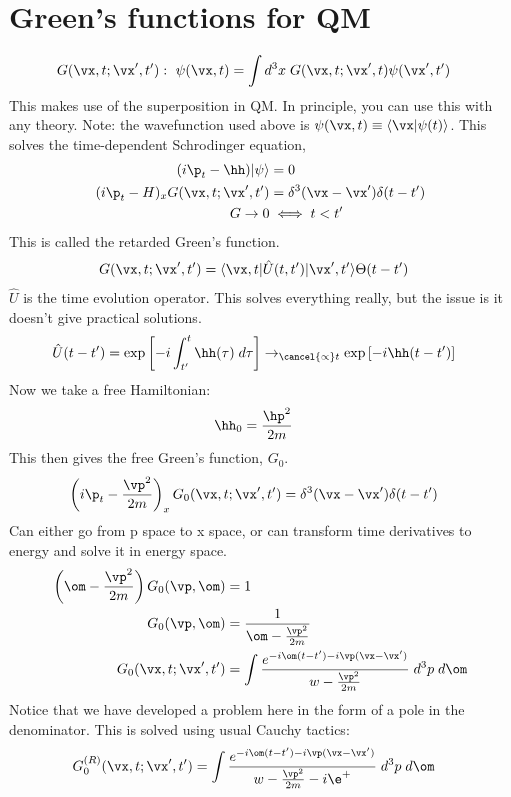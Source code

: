 \documentclass[a4paper, 11pt, normalem]{report}
\begin{document}
\section{Green's functions for QM}
\begin{align}
    G(\vx,t;\vx',t'):~ \psi(\vx,t) &= \int d^3x\; G(\vx,t;\vx',t)\psi(\vx',t')
\end{align}
This makes use of the superposition in QM.
In principle, you can use this with any theory.
Note: the wavefunction used above is $\psi(\vx,t) \equiv \langle\vx|\psi(t)\rangle$.
This solves the time-dependent Schrodinger equation,
\begin{align}
    (i\p_t - \hh)|\psi\rangle &= 0 \\
    (i\p_t - H)_xG(\vx,t;\vx',t') &= \delta^3(\vx-\vx')\delta(t-t') \\
    G\to 0 &\iff t < t'
\end{align}
This is called the retarded Green's function.
\begin{align}
    G(\vx,t;\vx',t') &= \langle\vx,t|\hat{U}(t,t')|\vx',t'\rangle\Theta(t-t')
\end{align}
$\hat{U}$ is the time evolution operator.
This solves everything really, but the issue is it doesn't give practical solutions.
\begin{align}
    \hat{U}(t-t') &= \exp\left[-i\int_{t'}^{t} \hh(\tau)\; d\tau\right] \to_{\cancel{\propto} t}  \exp\left[-i\hh(t-t')\right]
\end{align}
Now we take a free Hamiltonian:
\begin{align}
    \hh_0 &= \frac{\hp^2}{2m}
\end{align}
This then gives the free Green's function, $G_0$.
\begin{align}
    \left(i\p_t-\frac{\vp^2}{2m}\right)_xG_0(\vx,t;\vx',t') &= \delta^3(\vx-\vx')\delta(t-t')
\end{align}
Can either go from p space to x space, or can transform time derivatives to energy and solve it in energy space.
\begin{align}
    \left(\om-\frac{\vp^2}{2m}\right) G_0(\vp,\om) &= 1 \\
    G_0(\vp,\om) &= \frac{1}{\om-\frac{\vp^2}{2m}} \\
    G_0(\vx,t;\vx',t') &= \int \frac{e^{-i\om(t-t')-i\vp(\vx-\vx')}}{w-\frac{\vp^2}{2m}}  \;d^3p\;d\om
\end{align}
Notice that we have developed a problem here in the form of a pole in the denominator.
This is solved using usual Cauchy tactics:
\begin{align}
    G_0^{(R)}(\vx,t;\vx',t') &= \int \frac{e^{-i\om(t-t')-i\vp(\vx-\vx')}}{w-\frac{\vp^2}{2m} - i\e^+}  \;d^3p\;d\om
\end{align}
\end{document}
